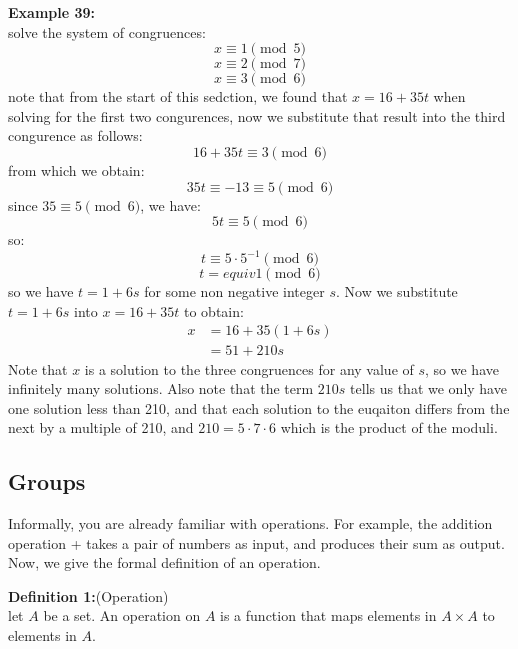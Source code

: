 \documentclass[12pt]{article}
\begin{document}
\newpage
\noindent\textbf{Example 39:}
\\ solve the system of congruences:
\[ x \equiv 1 \pmod{5} \]
\[ x \equiv 2 \pmod{7} \]
\[x \equiv 3 \pmod{6} \]
note that from the start of this sedction, we found that $x=16+35t$ when solving for the first two congurences, now we substitute that result into the third congurence as follows:
\[16 +35t \equiv 3 \pmod{6} \]
from which we obtain:
\[35t \equiv -13 \equiv 5 \pmod{6} \]
since $35 \equiv 5 \pmod{6}$, we have:
\[5t \equiv 5 \pmod{6} \]
so:
\[t \equiv 5 \cdot 5^{-1} \pmod{6} \]
\[ t =equiv 1 \pmod{6} \]
so we have $t=1+6s$ for some non negative integer $s$. Now we substitute $t=1+6s$ into $x=16+35t$ to obtain:
\begin{align*}
    x &= 16 + 35(1+6s) \\
    &= 51 + 210s
\end{align*}
Note that $x$ is a solution to the three congruences for any value of $s$, so we have infinitely many solutions. Also note that the term $210s$ tells us that we only have one solution less than 210, and  that each solution to the euqaiton differs from the next by a multiple of 210, and $210=5 \cdot 7 \cdot 6$ which is the product of the moduli.

\subsection{Groups}
Informally, you are already familiar with operations. For example, the addition operation + takes a pair of
numbers as input, and produces their sum as output. Now, we give the formal definition of an operation.

\vspace{5mm}
\noindent\textbf{Definition 1:}(Operation)
\\
let $A$ be a set. An operation on $A$ is a function that maps elements in $A \times A$ to elements in $A$. 
\end{document}
